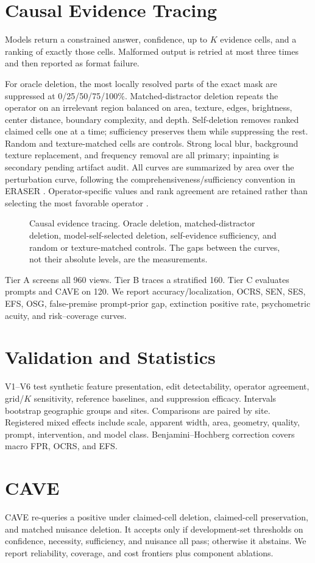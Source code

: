 \section{Causal Evidence Tracing}
Models return a constrained answer, confidence, up to $K$ evidence cells, and a
ranking of exactly those cells. Malformed output is retried at most three times
and then reported as format failure.

For oracle deletion, the most locally resolved parts of the exact mask are
suppressed at 0/25/50/75/100\%. Matched-distractor deletion repeats the operator
on an irrelevant region balanced on area, texture, edges, brightness, center
distance, boundary complexity, and depth. Self-deletion removes ranked claimed
cells one at a time; sufficiency preserves them while suppressing the rest.
Random and texture-matched cells are controls. Strong local blur, background
texture replacement, and frequency removal are all primary; inpainting is
secondary pending artifact audit.
All curves are summarized by area over the perturbation curve, following the
comprehensiveness/sufficiency convention in ERASER \cite{deyoung2020eraser}.
Operator-specific values and rank agreement are retained rather than selecting
the most favorable operator \cite{basu2026ice}.

\begin{figure}[t]
  \centering
  \caption{Causal evidence tracing. Oracle deletion, matched-distractor deletion,
  model-self-selected deletion, self-evidence sufficiency, and random or
  texture-matched controls. The gaps between the curves, not their absolute
  levels, are the measurements.}
  \label{fig:traces}
\end{figure}

Tier A screens all 960 views. Tier B traces a stratified 160. Tier C evaluates
prompts and CAVE on 120. We report accuracy/localization, OCRS, SEN, SES, EFS,
OSG, false-premise prompt-prior gap, extinction positive rate, psychometric
acuity, and risk--coverage curves.

\section{Validation and Statistics}
V1--V6 test synthetic feature presentation, edit detectability, operator
agreement, grid/$K$ sensitivity, reference baselines, and suppression efficacy.
Intervals bootstrap geographic groups and sites. Comparisons are paired by
site. Registered mixed effects include scale, apparent width, area, geometry,
quality, prompt, intervention, and model class. Benjamini--Hochberg correction
covers macro FPR, OCRS, and EFS.

\section{CAVE}
CAVE re-queries a positive under claimed-cell deletion, claimed-cell
preservation, and matched nuisance deletion. It accepts only if development-set
thresholds on confidence, necessity, sufficiency, and nuisance all pass;
otherwise it abstains. We report reliability, coverage, and cost frontiers plus
component ablations.
